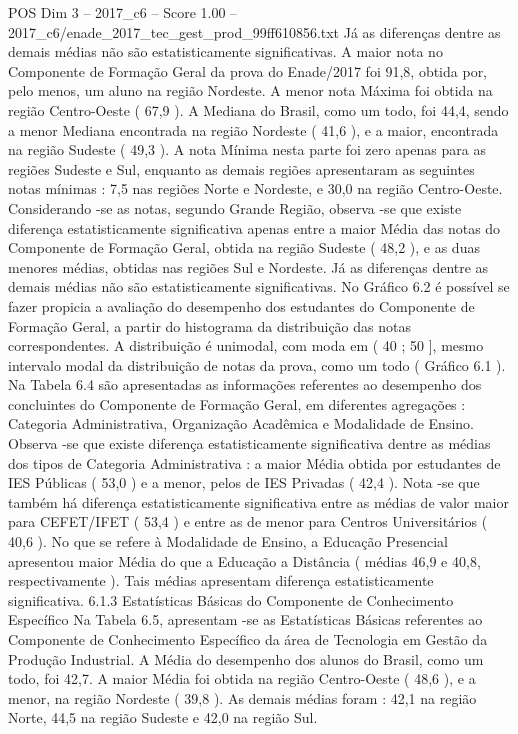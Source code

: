 \begin{textsample}{POS Dim 3 – 2017\_c6 – Score 1.00 – 2017\_c6/enade\_2017\_tec\_gest\_prod\_99ff610856.txt}
Já as diferenças dentre as demais médias não são estatisticamente significativas.
A maior nota no Componente de Formação Geral da prova do Enade/2017 foi 91,8, obtida por, pelo menos, um aluno na região Nordeste.
A menor nota Máxima foi obtida na região Centro-Oeste ( 67,9 ).
A Mediana do Brasil, como um todo, foi 44,4, sendo a menor Mediana encontrada na região Nordeste ( 41,6 ), e a maior, encontrada na região Sudeste ( 49,3 ).
A nota Mínima nesta parte foi zero apenas para as regiões Sudeste e Sul, enquanto as demais regiões apresentaram as seguintes notas mínimas : 7,5 nas regiões Norte e Nordeste, e 30,0 na região Centro-Oeste.
Considerando -se as notas, segundo Grande Região, observa -se que existe diferença estatisticamente significativa apenas entre a maior Média das notas do Componente de Formação Geral, obtida na região Sudeste ( 48,2 ), e as duas menores médias, obtidas nas regiões Sul e Nordeste.
Já as diferenças dentre as demais médias não são estatisticamente significativas.
No Gráfico 6.2 é possível se fazer propicia a avaliação do desempenho dos estudantes do Componente de Formação Geral, a partir do histograma da distribuição das notas correspondentes.
A distribuição é unimodal, com moda em ( 40 ; 50 ], mesmo intervalo modal da distribuição de notas da prova, como um todo ( Gráfico 6.1 ).
Na Tabela 6.4 são apresentadas as informações referentes ao desempenho dos concluintes do Componente de Formação Geral, em diferentes agregações : Categoria Administrativa, Organização Acadêmica e Modalidade de Ensino.
Observa -se que existe diferença estatisticamente significativa dentre as médias dos tipos de Categoria Administrativa : a maior Média obtida por estudantes de IES Públicas ( 53,0 ) e a menor, pelos de IES Privadas ( 42,4 ).
Nota -se que também há diferença estatisticamente significativa entre as médias de valor maior para CEFET/IFET ( 53,4 ) e entre as de menor para Centros Universitários ( 40,6 ).
No que se refere à Modalidade de Ensino, a Educação Presencial apresentou maior Média do que a Educação a Distância ( médias 46,9 e 40,8, respectivamente ).
Tais médias apresentam diferença estatisticamente significativa. 6.1.3 Estatísticas Básicas do Componente de Conhecimento Específico Na Tabela 6.5, apresentam -se as Estatísticas Básicas referentes ao Componente de Conhecimento Específico da área de Tecnologia em Gestão da Produção Industrial.
A Média do desempenho dos alunos do Brasil, como um todo, foi 42,7.
A maior Média foi obtida na região Centro-Oeste ( 48,6 ), e a menor, na região Nordeste ( 39,8 ).
As demais médias foram : 42,1 na região Norte, 44,5 na região Sudeste e 42,0 na região Sul.

\end{textsample}
